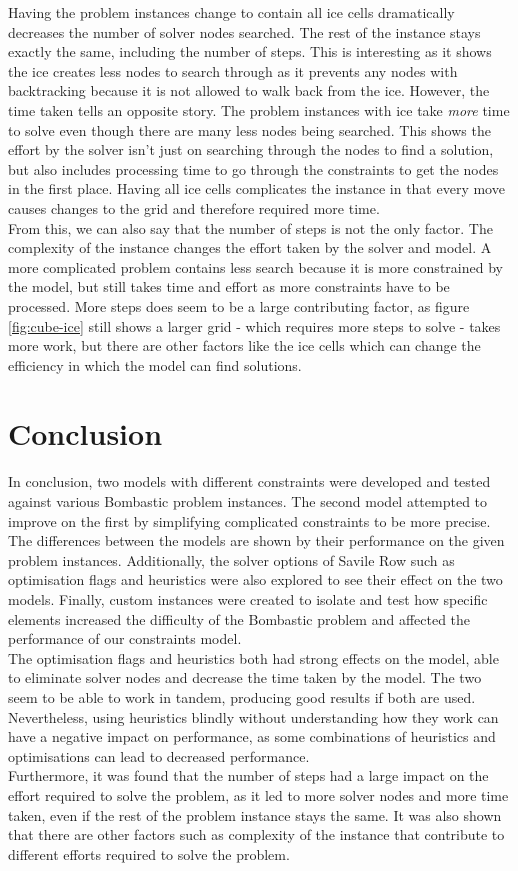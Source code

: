 \documentclass{article}
\newcommand{\n}[0]{\\[\baselineskip]}
\begin{document}
\noindent
Having the problem instances change to contain all ice cells dramatically decreases the number of solver nodes searched. The rest of the instance stays exactly the same, including the number of steps. This is interesting as it shows the ice creates less nodes to search through as it prevents any nodes with backtracking because it is not allowed to walk back from the ice. However, the time taken tells an opposite story. The problem instances with ice take \textit{more} time to solve even though there are many less nodes being searched. This shows the effort by the solver isn't just on searching through the nodes to find a solution, but also includes processing time to go through the constraints to get the nodes in the first place. Having all ice cells complicates the instance in that every move causes changes to the grid and therefore required more time. 
\n
From this, we can also say that the number of steps is not the only factor. The complexity of the instance changes the effort taken by the solver and model. A more complicated problem contains less search because it is more constrained by the model, but still takes time and effort as more constraints have to be processed. More steps does seem to be a large contributing factor, as figure \ref{fig:cube-ice} still shows a larger grid - which requires more steps to solve - takes more work, but there are other factors like the ice cells which can change the efficiency in which the model can find solutions.


\section{Conclusion}
In conclusion, two models with different constraints were developed and tested against various Bombastic problem instances. The second model attempted to improve on the first by simplifying complicated constraints to be more precise. The differences between the models are shown by their performance on the given problem instances. Additionally, the solver options of Savile Row such as optimisation flags and heuristics were also explored to see their effect on the two models. Finally, custom instances were created to isolate and test how specific elements increased the difficulty of the Bombastic problem and affected the performance of our constraints model.
\n
The optimisation flags and heuristics both had strong effects on the model, able to eliminate solver nodes and decrease the time taken by the model. The two seem to be able to work in tandem, producing good results if both are used. Nevertheless, using heuristics blindly without understanding how they work can have a negative impact on performance, as some combinations of heuristics and optimisations can lead to decreased performance. 
\n
Furthermore, it was found that the number of steps had a large impact on the effort required to solve the problem, as it led to more solver nodes and more time taken, even if the rest of the problem instance stays the same. It was also shown that there are other factors such as complexity of the instance that contribute to different efforts required to solve the problem.




\printbibliography
\end{document}
